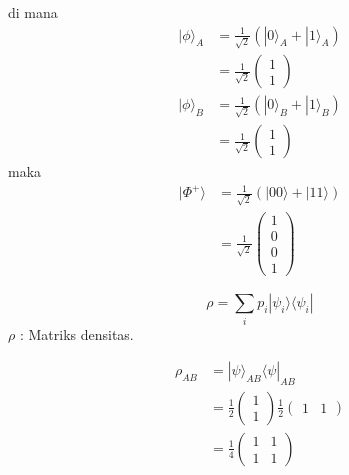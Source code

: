 di mana
\begin{equation}
    \begin{split}
    |\phi\rangle_A &= \frac{1}{\sqrt{2}} (|0\rangle_A + |1\rangle_A) \\
    &= \frac{1}{\sqrt{2}} \begin{pmatrix} 1 \\ 1 \end{pmatrix}
    \end{split}
\end{equation}
\begin{equation}
    \begin{split}
    |\phi\rangle_B &= \frac{1}{\sqrt{2}} (|0\rangle_B + |1\rangle_B) \\
    &= \frac{1}{\sqrt{2}} \begin{pmatrix} 1 \\ 1 \end{pmatrix}
    \end{split}
\end{equation}
maka
\begin{equation}
    \begin{split}
    |\Phi^+\rangle &= \frac{1}{\sqrt{2}} \left( |00\rangle + |11\rangle \right) \\
    &= \frac{1}{\sqrt{2}} \begin{pmatrix} 1 \\ 0 \\ 0 \\ 1 \end{pmatrix}
    \end{split}
\end{equation}

\begin{equation}
    \rho = \sum_i p_i |\psi_i\rangle \langle \psi_i |
\end{equation}
$\rho$ : Matriks densitas.

\begin{equation}
    \begin{split}
    \rho_{AB} &= |\psi\rangle_{AB} \langle \psi|_{AB} \\
    &= \frac{1}{2} \begin{pmatrix} 1 \\ 1 \end{pmatrix} \frac{1}{2} \begin{pmatrix} 1 & 1 \end{pmatrix} \\
    &= \frac{1}{4} \begin{pmatrix} 1 & 1 \\ 1 & 1 \end{pmatrix}
    \end{split}
\end{equation}

